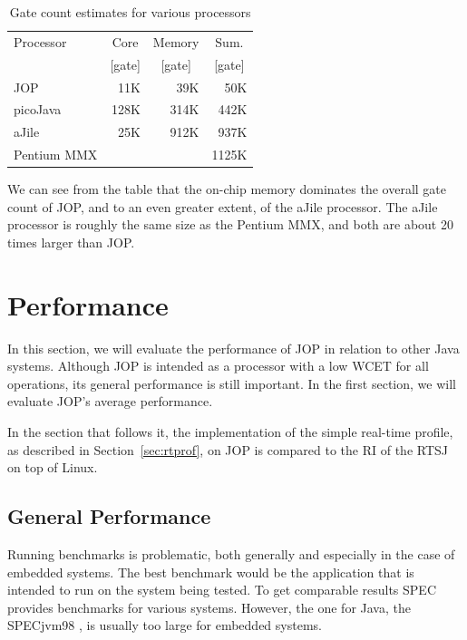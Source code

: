 \begin{table}
    \centering
    \begin{tabular}{lrrr}
        \toprule
        Processor & \multicolumn{1}{c}{Core} & \multicolumn{1}{c}{Memory} & \multicolumn{1}{c}{Sum.} \\
        & \multicolumn{1}{c}{[gate]} & \multicolumn{1}{c}{[gate]} & \multicolumn{1}{c}{[gate]}\\
        \midrule
        JOP & 11K & 39K & 50K\\
        picoJava & 128K & 314K & 442K\\
        aJile & 25K & 912K & 937K\\
        Pentium MMX & & & 1125K\\
        \bottomrule
    \end{tabular}
    \caption{Gate count estimates for various processors}
    \label{tab:results:gate:count}
\end{table}

We can see from the table that the on-chip memory dominates the
overall gate count of JOP, and to an even greater extent, of the
aJile processor. The aJile processor is roughly the same size as the
Pentium MMX, and both are about 20 times larger than JOP.


\section{Performance}
\label{sec:performance}

In this section, we will evaluate the performance of JOP in relation
to other Java systems. Although JOP is intended as a processor with
a low WCET for all operations, its general performance is still
important. In the first section, we will evaluate JOP's average
performance.

In the section that follows it, the implementation of the simple
real-time profile, as described in Section~\ref{sec:rtprof}, on JOP
is compared to the RI of the RTSJ on top of Linux.

\subsection{General Performance}

Running benchmarks is problematic, both generally and especially in
the case of embedded systems. The best benchmark would be the
application that is intended to run on the system being tested. To
get comparable results SPEC provides benchmarks for various systems.
However, the one for Java, the SPECjvm98 \cite{SPECJvm98}, is
usually too large for embedded systems.

